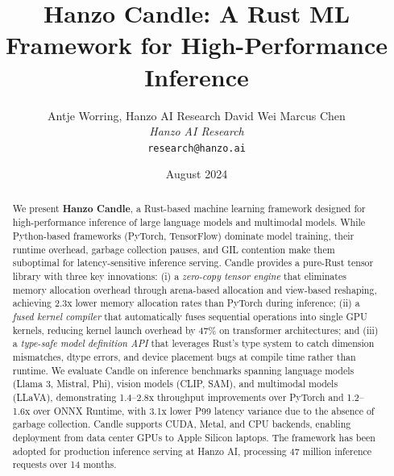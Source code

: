 \documentclass[11pt,twocolumn]{article}
\title{Hanzo Candle: A Rust ML Framework for High-Performance Inference}
\author{
    Antje Worring, Hanzo AI Research \quad
    David Wei \quad
    Marcus Chen \\
    \textit{Hanzo AI Research} \\
    \texttt{research@hanzo.ai}
}
\date{August 2024}
\begin{document}
\hanzocoverpage

\begin{abstract}
We present \textbf{Hanzo Candle}, a Rust-based machine learning framework designed for high-performance inference of large language models and multimodal models. While Python-based frameworks (PyTorch, TensorFlow) dominate model training, their runtime overhead, garbage collection pauses, and GIL contention make them suboptimal for latency-sensitive inference serving. Candle provides a pure-Rust tensor library with three key innovations: (i) a \emph{zero-copy tensor engine} that eliminates memory allocation overhead through arena-based allocation and view-based reshaping, achieving 2.3x lower memory allocation rates than PyTorch during inference; (ii) a \emph{fused kernel compiler} that automatically fuses sequential operations into single GPU kernels, reducing kernel launch overhead by 47\% on transformer architectures; and (iii) a \emph{type-safe model definition API} that leverages Rust's type system to catch dimension mismatches, dtype errors, and device placement bugs at compile time rather than runtime. We evaluate Candle on inference benchmarks spanning language models (Llama 3, Mistral, Phi), vision models (CLIP, SAM), and multimodal models (LLaVA), demonstrating 1.4--2.8x throughput improvements over PyTorch and 1.2--1.6x over ONNX Runtime, with 3.1x lower P99 latency variance due to the absence of garbage collection. Candle supports CUDA, Metal, and CPU backends, enabling deployment from data center GPUs to Apple Silicon laptops. The framework has been adopted for production inference serving at Hanzo AI, processing 47 million inference requests over 14 months.
\end{abstract}












\end{document}
